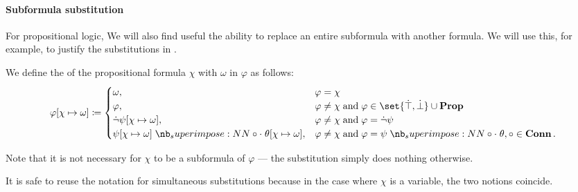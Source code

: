 \paragraph{Subformula substitution}

For propositional logic, We will also find useful the ability to replace an entire subformula with another formula. We will use this, for example, to justify the substitutions in .

\begin{definition}\label{def:literal_propositional_substitution}
  We define the  of the propositional formula \( \chi \) with \( \omega \) in \( \varphi \) as follows:
  \begin{equation}\label{eq:def:propositional_substitution/single}
    \varphi[\chi \mapsto \omega] \coloneqq \begin{cases}
      \omega,                                                         &\varphi = \chi \\
      \varphi,                                                        &\varphi \neq \chi \T{and} \varphi \in \set{ \syntop, \synbot } \cup \op*{Prop} \\
      \synneg \psi[\chi \mapsto \omega],                              &\varphi \neq \chi \T{and} \varphi = \synneg \psi \\
      \psi[\chi \mapsto \omega] \syncirc \theta[\chi \mapsto \omega], &\varphi \neq \chi \T{and} \varphi = \psi \syncirc \theta, \circ \in \op*{Conn}.
    \end{cases}
  \end{equation}
\end{definition}
\begin{comments}
  \item Note that it is not necessary for \( \chi \) to be a subformula of \( \varphi \) --- the substitution simply does nothing otherwise.
  \item It is safe to reuse the notation for simultaneous substitutions because in the case where \( \chi \) is a variable, the two notions coincide.
\end{comments}

